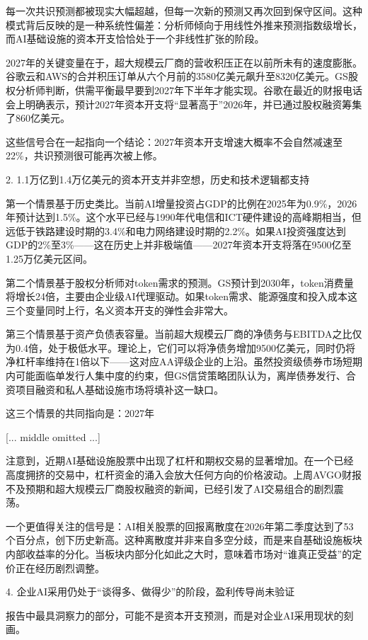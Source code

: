 \documentclass[11pt]{ctexart}
\begin{document}
每一次共识预测都被现实大幅超越，但每一次新的预测又再次回到保守区间。这种模式背后反映的是一种系统性偏差：分析师倾向于用线性外推来预测指数级增长，而AI基础设施的资本开支恰恰处于一个非线性扩张的阶段。

2027年的关键变量在于，超大规模云厂商的营收积压正在以前所未有的速度膨胀。谷歌云和AWS的合并积压订单从六个月前的3580亿美元飙升至8320亿美元。GS股权分析师判断，供需平衡最早要到2027年下半年才能实现。谷歌在最近的财报电话会上明确表示，预计2027年资本开支将“显著高于”2026年，并已通过股权融资筹集了860亿美元。

这些信号合在一起指向一个结论：2027年资本开支增速大概率不会自然减速至22\%，共识预测很可能再次被上修。

2. 1.1万亿到1.4万亿美元的资本开支并非空想，历史和技术逻辑都支持

第一个情景基于历史类比。当前AI增量投资占GDP的比例在2025年为0.9\%，2026年预计达到1.5\%。这个水平已经与1990年代电信和ICT硬件建设的高峰期相当，但远低于铁路建设时期的3.4\%和电力网络建设时期的2.2\%。如果AI投资强度达到GDP的2\%至3\%——这在历史上并非极端值——2027年资本开支将落在9500亿至1.25万亿美元区间。

第二个情景基于股权分析师对token需求的预测。GS预计到2030年，token消费量将增长24倍，主要由企业级AI代理驱动。如果token需求、能源强度和投入成本这三个变量同时上行，名义资本开支的弹性会非常大。

第三个情景基于资产负债表容量。当前超大规模云厂商的净债务与EBITDA之比仅为0.4倍，处于极低水平。理论上，它们可以将净债务增加9500亿美元，同时仍将净杠杆率维持在1倍以下——这对应AA评级企业的上沿。虽然投资级债券市场短期内可能面临单发行人集中度的约束，但GS信贷策略团队认为，离岸债券发行、合资项目融资和私人基础设施市场将填补这一缺口。

这三个情景的共同指向是：2027年

[... middle omitted ...]

注意到，近期AI基础设施股票中出现了杠杆和期权交易的显著增加。在一个已经高度拥挤的交易中，杠杆资金的涌入会放大任何方向的价格波动。上周AVGO财报不及预期和超大规模云厂商股权融资的新闻，已经引发了AI交易组合的剧烈震荡。

一个更值得关注的信号是：AI相关股票的回报离散度在2026年第二季度达到了53个百分点，创下历史新高。这种离散度并非来自多空分歧，而是来自基础设施板块内部收益率的分化。当板块内部分化如此之大时，意味着市场对“谁真正受益”的定价正在经历剧烈调整。

4. 企业AI采用仍处于“谈得多、做得少”的阶段，盈利传导尚未验证

报告中最具洞察力的部分，可能不是资本开支预测，而是对企业AI采用现状的刻画。
\end{document}
